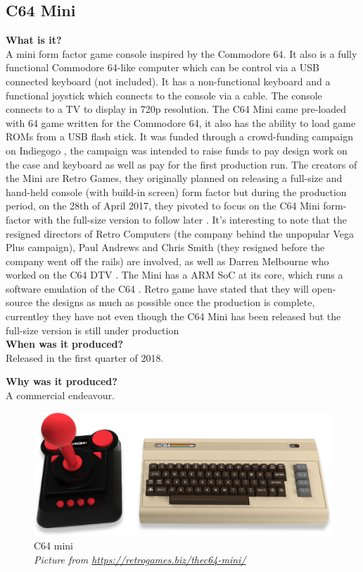 \subsection{C64 Mini}
\textbf{What is it?}\\
A mini form factor game console inspired by the Commodore 64. It also is a fully functional Commodore 64-like computer which can be control via a USB connected keyboard (not included). It has a non-functional keyboard and a functional joystick which connects to the console via a cable. The console connects to a TV to display in 720p resolution. The C64 Mini came pre-loaded with 64 game written for the Commodore 64, it also has the ability to load game ROMs from a USB flash stick. It was funded through a crowd-funding campaign on Indiegogo 
\cite{RN124}, the campaign was intended to raise funds to pay design work on the case and keyboard as well as pay for the first production run. The creators of the Mini are Retro Games, they originally planned on releasing a full-size and hand-held console (with build-in screen) form factor but during the production period, on the 28th of April 2017, they pivoted to focus on the C64 Mini form-factor with the full-size version to follow later 
\cite{RN160}. It's interesting to note that the resigned directors of Retro Computers (the company behind the unpopular Vega Plus campaign), Paul Andrews and Chris Smith (they resigned before the company went off the rails) are involved, as well as Darren Melbourne who worked on the C64 DTV 
\cite{RN127}. The Mini has a ARM SoC at its core, which runs a software emulation of the C64 
\cite{RN160}. Retro game have stated that they will open-source the designs as much as possible once the production is complete, currentley they have not even though the C64 Mini has been released but the full-size version is still under production\\

\textbf{When was it produced?}\\
Released in the first quarter of 2018.

\textbf{Why was it produced?}\\
A commercial endeavour. 

\begin{figure} \begin{center}
\includegraphics[width=.3\linewidth]{pics/C64_mini} 
\end{center} 
\caption{C64 mini\\ \textit{\small{Picture from \url {https://retrogames.biz/thec64-mini/}}}}
\label{C64_mini}
\end{figure}


